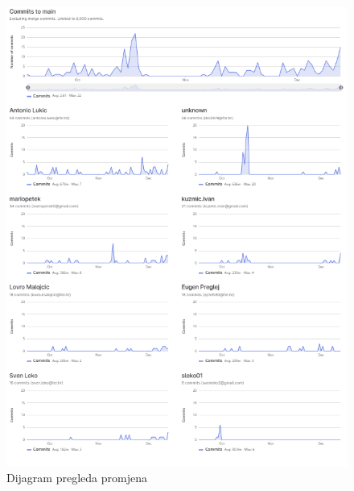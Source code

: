 		\begin{figure}[H]
		\centering
		\includegraphics[width=14cm]{slike/dijagramPromjena}
		\caption{Dijagram pregleda promjena}
		\label{fig:Dijagram-promjena}
	\end{figure}
		
	
